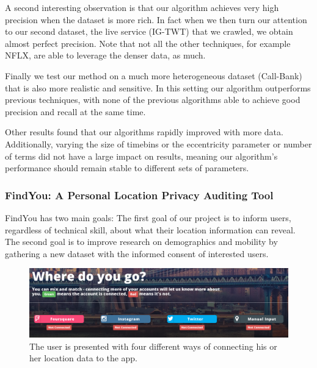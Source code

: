 A second interesting observation is that our algorithm achieves very high precision when the dataset is more rich. 
In fact when we then turn our attention to our second dataset, the live service (IG-TWT) that we crawled, we obtain almost perfect precision. 
Note that not all the other techniques, for example NFLX, are able to leverage the denser data, as much.

Finally we test our method on a much more heterogeneous dataset (Call-Bank) that is also more realistic and sensitive. 
In this setting our algorithm outperforms previous techniques, with none of the previous algorithms able to achieve good precision and recall at the same time. 

Other results found that our algorithms rapidly improved with more data.
Additionally, varying the size of timebins or the eccentricity parameter or number of terms did not have a large impact on results, meaning our algorithm's performance should remain stable to different sets of parameters.



\subsubsection{FindYou: A Personal Location Privacy Auditing Tool}


FindYou has two main goals:
The first goal of our project is to inform users, regardless of technical skill, about what their location information can reveal. 
The second goal is to improve research on demographics and mobility by gathering a new dataset with the informed consent of interested users.

\begin{figure}[h]
  \includegraphics[width=\figwidth]{fig/findyou/connection.png}
  \caption{The user is presented with four different ways of connecting his or her location data to the app.}
  \label{fig:connection}
\end{figure}

